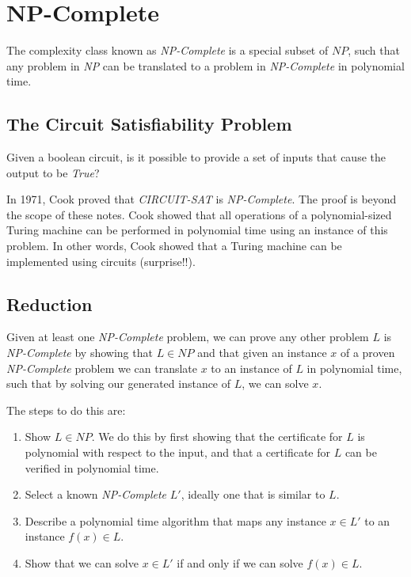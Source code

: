 \chapter{NP-Complete}

The complexity class known as \emph{NP-Complete} is a special subset
of $NP$, such that any problem in \emph{NP} can be translated to a
problem in \emph{NP-Complete} in polynomial time.

\section{The Circuit Satisfiability Problem}

Given a boolean circuit, is it possible to provide a set of inputs
that cause the output to be \emph{True}?

In 1971, Cook proved that \emph{CIRCUIT-SAT} is \emph{NP-Complete}.
The proof is beyond the scope of these notes.  Cook showed that all
operations of a polynomial-sized Turing machine can be performed in
polynomial time using an instance of this problem.  In other words,
Cook showed that a Turing machine can be implemented using circuits
(surprise!!).

\section{Reduction}

Given at least one \emph{NP-Complete} problem, we can prove any other
problem $L$ is \emph{NP-Complete} by showing that $L \in NP$ and that
given an instance $x$ of a proven \emph{NP-Complete} problem we can
translate $x$ to an instance of $L$ in polynomial time, such that by
solving our generated instance of $L$, we can solve $x$.

The steps to do this are:

\begin{enumerate}
\item Show $L \in NP$.  We do this by first showing that the
  certificate for $L$ is polynomial with respect to the input, and
  that a certificate for $L$ can be verified in polynomial time.

\item Select a known \emph{NP-Complete} $L'$, ideally one that is
  similar to $L$.

\item Describe a polynomial time algorithm that maps any instance $x
  \in L'$ to an instance $f(x) \in L$.

\item Show that we can solve $x \in L'$ if and only if we can solve
  $f(x) \in L$.
\end{enumerate}

